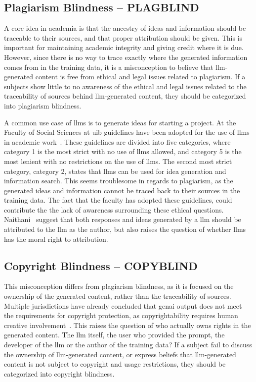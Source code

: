 \subsection{Plagiarism Blindness -- PLAGBLIND}\label{plagblind}
A core idea in academia is that the ancestry of ideas and information should be traceable to their sources, and that proper attribution should be given. This is important for maintaining academic integrity and giving credit where it is due. However, since there is no way to trace exactly where the generated information comes from in the training data, it is a misconception to believe that \gls{llm}-generated content is free from ethical and legal issues related to plagiarism. If a subjects show little to no awareness of the ethical and legal issues related to the traceability of sources behind \gls{llm}-generated content, they should be categorized into plagiarism blindness.

A common use case of \gls{llms} is to generate ideas for starting a project. At the Faculty of Social Sciences at \gls{uib} guidelines have been adopted for the use of \gls{llms} in academic work~\cite{uib_ki_retningslinjer_2025}. 
These guidelines are divided into five categories, where category 1 is the most strict with no use of \gls{llms} allowed, and category 5 is the most lenient with no restrictions on the use of \gls{llms}. The second most strict category, category 2, states that \gls{llms} can be used for idea generation and information search. This seems troublesome in regards to plagiarism, as the generated ideas and information cannot be traced back to their sources in the training data. The fact that the faculty has adopted these guidelines, could contribute the the lack of awareness surrounding these ethical questions. 
Naithani~\cite{naithani_issues_2025} suggest that both responses and ideas generated by a \gls{llm} should be attributed to the \gls{llm} as the author, but also raises the question of whether \gls{llms} has the moral right to attribution.

\subsection{Copyright Blindness -- COPYBLIND}\label{copyblind}
This misconception differs from plagiarism blindness, as it is focused on the ownership of the generated content, rather than the traceability of sources. Multiple jurisdictions have already concluded that \gls{genai} output does not meet the requirements for copyright protection, as copyrightability requires human creative involvement~\cite{dlapiper_genai_copyright_2025,lundqvist_ai_creativity_2025}. This raises the question of who actually owns rights in the generated content. The \gls{llm} itself, the user who provided the prompt, the developer of the \gls{llm} or the author of the training data? If a subject fail to discuss the ownership of \gls{llm}-generated content, or express beliefs that \gls{llm}-generated content is not subject to copyright and usage restrictions, they should be categorized into copyright blindness.

